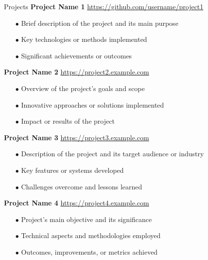 \begin{rSection}{Projects}
\vspace{0.12cm}
{\bf Project Name 1}
\hspace{2 cm}{Technology 1, Technology 2, Technology 3}
\hfill{\href{https://github.com/username/project1}{https://github.com/username/project1}}
\begin{itemize}[label=\myfancylabel, leftmargin=0.5cm, topsep=-5pt]
    \item[$\bullet$] Brief description of the project and its main purpose
    \item[$\bullet$] Key technologies or methods implemented
    \item[$\bullet$] Significant achievements or outcomes
\end{itemize}

\vspace{0.12cm}
{\bf Project Name 2}
\hspace{2 cm}{Technology 4, Technology 5, Technology 6}
\hfill{\href{https://project2.example.com}{https://project2.example.com}}
\begin{itemize}[label=\myfancylabel, leftmargin=0.5cm, topsep=-5pt]
    \item[$\bullet$] Overview of the project's goals and scope
    \item[$\bullet$] Innovative approaches or solutions implemented
    \item[$\bullet$] Impact or results of the project
\end{itemize}

\vspace{0.12cm}
{\bf Project Name 3}
\hspace{2 cm}{Technology 7, Technology 8}
\hfill{\href{https://project3.example.com}{https://project3.example.com}}
\begin{itemize}[label=\myfancylabel, leftmargin=0.5cm, topsep=-5pt]
    \item[$\bullet$] Description of the project and its target audience or industry
    \item[$\bullet$] Key features or systems developed
    \item[$\bullet$] Challenges overcome and lessons learned
\end{itemize}

\vspace{0.12cm}
{\bf Project Name 4}
\hspace{2 cm}{Technology 9, Technology 10}
\hfill{\href{https://project4.example.com}{https://project4.example.com}}
\begin{itemize}[label=\myfancylabel, leftmargin=0.5cm, topsep=-5pt]
    \item[$\bullet$] Project's main objective and its significance
    \item[$\bullet$] Technical aspects and methodologies employed
    \item[$\bullet$] Outcomes, improvements, or metrics achieved
\end{itemize}
\end{rSection}
